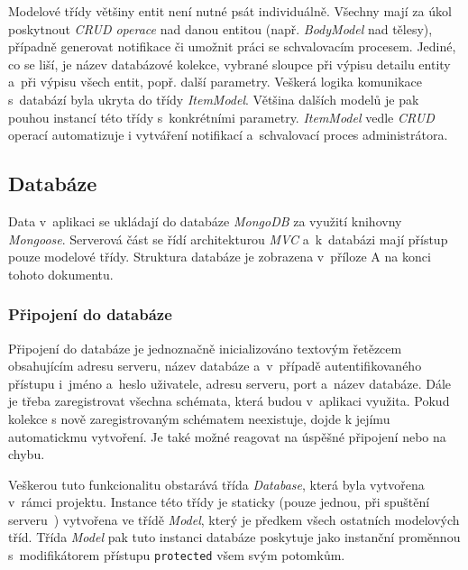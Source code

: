 \documentclass[a4paper,12pt]{article}
\def\code#1{\texttt{#1}}
\begin{document}
Modelové třídy většiny entit není nutné psát individuálně. Všechny mají za úkol poskytnout \textit{CRUD operace} nad danou entitou (např. \textit{BodyModel} nad tělesy), případně generovat notifikace či umožnit práci se schvalovacím procesem. Jediné, co se liší, je název databázové kolekce, vybrané sloupce při výpisu detailu entity a~při výpisu všech entit, popř. další parametry. Veškerá logika komunikace s~databází byla ukryta do třídy \textit{ItemModel}. Většina dalších modelů je pak pouhou instancí této třídy s~konkrétními parametry. \textit{ItemModel} vedle \textit{CRUD} operací automatizuje i vytváření notifikací a~schvalovací proces administrátora.



\vspace*{-0.5cm}
\subsection{Databáze}

Data v~aplikaci se ukládají do databáze \textit{MongoDB} za využití knihovny \textit{Mongoose}. Serverová část se řídí architekturou \textit{MVC} a~k~databázi mají přístup pouze modelové třídy. Struktura databáze je zobrazena v~příloze A na konci tohoto dokumentu.

\subsubsection{Připojení do databáze}

Připojení do databáze je jednoznačně inicializováno textovým řetězcem obsahujícím adresu serveru, název databáze a~v~případě autentifikovaného přístupu i~jméno a~heslo uživatele, adresu serveru, port a~název databáze. Dále je třeba zaregistrovat všechna schémata, která budou v~aplikaci využita. Pokud kolekce s nově zaregistrovaným schématem neexistuje, dojde k jejímu automatickmu vytvoření. Je také možné reagovat na úspěšné připojení nebo na chybu.~\cite{nodebook}

Veškerou tuto funkcionalitu obstarává třída \textit{Database}, která byla vytvořena v~rámci projektu. Instance této třídy je staticky (pouze jednou, při spuštění serveru~\cite{nodebook}) vytvořena ve třídě \textit{Model}, který je předkem všech ostatních modelových tříd. Třída \textit{Model} pak tuto instanci databáze poskytuje jako instanční proměnnou s~modifikátorem přístupu \code{protected} všem svým potomkům.
\end{document}
